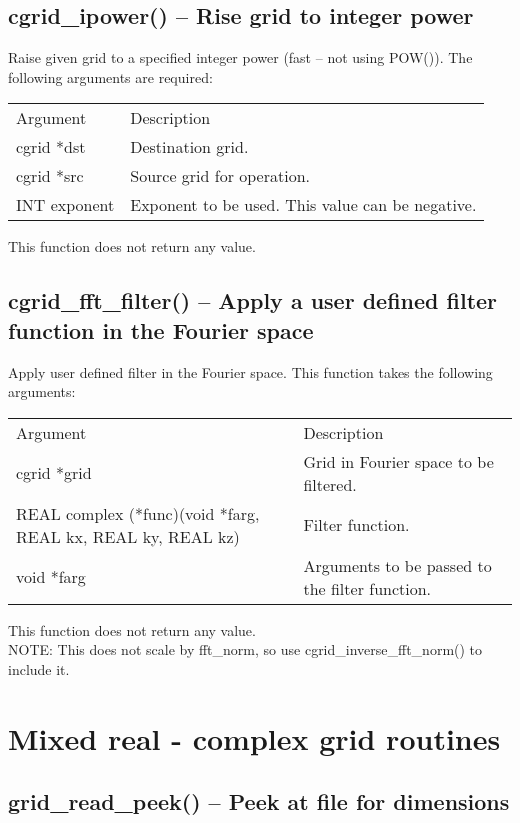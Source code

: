 \documentclass[12pt,letterpaper]{report}
\begin{document}
\subsection{cgrid\_ipower() -- Rise grid to integer power}

Raise given grid to a specified integer power (fast -- not using POW()). The following arguments are required:
\begin{longtable}{p{} p{}}
Argument & Description\\
\cline{1-2}
cgrid *dst & Destination grid.\\
cgrid *src & Source grid for operation.\\
INT exponent & Exponent to be used. This value can be negative.\\
\end{longtable}
\noindent
This function does not return any value. 

\subsection{cgrid\_fft\_filter() -- Apply a user defined filter function in the Fourier space}

Apply user defined filter in the Fourier space. This function takes the following arguments:
\begin{longtable}{p{} p{}}
Argument & Description\\
\cline{1-2}
cgrid *grid & Grid in Fourier space to be filtered.\\
REAL complex (*func)(void *farg, REAL kx, REAL ky, REAL kz) & Filter function.\\
void *farg & Arguments to be passed to the filter function.\\
\end{longtable}
\noindent
This function does not return any value.\\
NOTE: This does not scale by fft\_norm, so use cgrid\_inverse\_fft\_norm() to include it.

\section{Mixed real - complex grid routines}

\subsection{grid\_read\_peek() -- Peek at file for dimensions}
\end{document}
